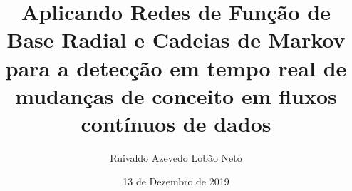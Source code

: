 \documentclass[msc, classic, a4paper]{ufbathesis}
\institute{Instituto de Matem\'{a}tica}
\title{Aplicando Redes de Função de Base Radial e Cadeias de Markov para a detecção em tempo real de mudanças de conceito em fluxos contínuos de dados}
\date{13 de Dezembro de 2019}
\author{Ruivaldo Azevedo Lobão Neto}
\begin{document}
\pgcompfrontpage

\frontmatter

\pgcomppresentationpage










\resumo
\end{document}
